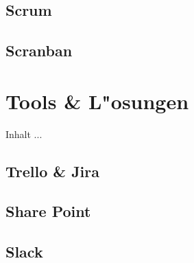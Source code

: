 \subsection{Scrum}

\subsection{Scranban}

\section{Tools \& L"osungen}
Inhalt ...

\subsection{Trello \& Jira}

\subsection{Share Point}

\subsection{Slack}
